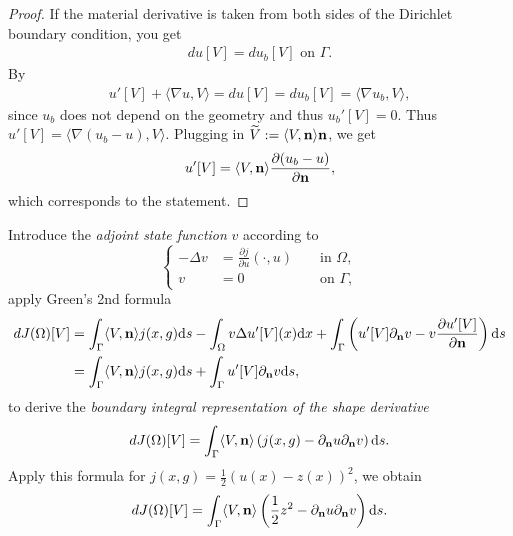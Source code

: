 \documentclass[oneside,11pt]{book}
\numberwithin{equation}{section}
\begin{document}
\begin{proof}
    If the material derivative is taken from both sides of the Dirichlet boundary condition, you get
    \begin{align}
        du[V] = du_b[V] \mbox{ on } \Gamma.
    \end{align}
    By 
    \begin{align}
        u'[V] + \langle\nabla u,V\rangle = du[V] = du_b[V] = \langle\nabla u_b,V\rangle,
    \end{align}
    since $u_b$ does not depend on the geometry and thus $u_b'[V] = 0$. Thus $u'[V] = \langle\nabla(u_b - u),V\rangle$. Plugging in $\widetilde{V} := \langle V,{\bf n}\rangle{\bf n}$, we get
    \begin{align}
        u'[V] = \langle V,{\bf n}\rangle\frac{\partial(u_b - u)}{\partial{\bf n}},
    \end{align}
    which corresponds to the statement.
\end{proof}
Introduce the \textit{adjoint state function} $v$ according to
\begin{equation}
    \left\{\begin{split}
        -\Delta v &= \frac{\partial j}{\partial u}(\cdot,u) &&\mbox{ in } \Omega,\\
        v &= 0 &&\mbox{ on } \Gamma,
    \end{split}\right.
\end{equation}
apply Green's 2nd formula
\begin{align}
    dJ(\Omega)[V] &= \int_\Gamma \langle V,{\bf n}\rangle j(x,g){\rm d}s - \int_\Omega v\Delta u'[V](x){\rm d}x + \int_\Gamma \left(u'[V]\partial_{\bf n}v - v\frac{\partial u'[V]}{\partial{\bf n}}\right){\rm d}s\\
    &= \int_\Gamma \langle V,{\bf n}\rangle j(x,g){\rm d}s + \int_\Gamma u'[V]\partial_{\bf n}v{\rm d}s,
\end{align}
to derive the \textit{boundary integral representation of the shape derivative}
\begin{align}
    dJ(\Omega)[V] = \int_\Gamma \langle V,{\bf n}\rangle\left(j(x,g) - \partial_{\bf n}u\partial_{\bf n}v\right){\rm d}s.
\end{align}
Apply this formula for $j(x,g)  = \frac{1}{2}(u(x) - z(x))^2$, we obtain
\begin{align}
    dJ(\Omega)[V] = \int_\Gamma \langle V,{\bf n}\rangle\left(\frac{1}{2}z^2 - \partial_{\bf n}u\partial_{\bf n}v\right){\rm d}s.
\end{align}
\end{document}
